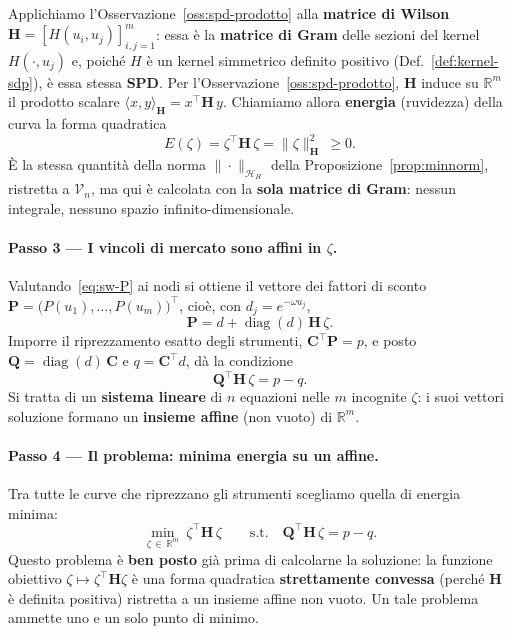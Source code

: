 \documentclass[11pt,a4paper]{article}
\theoremstyle{plain}
\theoremstyle{definition}
\theoremstyle{remark}
\newcommand{\Qmat}{\mathbf{Q}}
\newcommand{\Hmat}{\mathbf{H}}
\newcommand{\transp}{^{\!\top}}
\begin{document}
Applichiamo l'Osservazione~\ref{oss:spd-prodotto} alla \textbf{matrice di Wilson}
$\Hmat = [H(u_i,u_j)]_{i,j=1}^{m}$: essa \`e la \textbf{matrice di Gram} delle sezioni del
kernel $H(\cdot,u_j)$ e, poich\'e $H$ \`e un kernel simmetrico definito positivo
(Def.~\ref{def:kernel-sdp}), \`e essa stessa \textbf{SPD}. Per
l'Osservazione~\ref{oss:spd-prodotto}, $\Hmat$ induce su $\mathbb{R}^m$ il prodotto scalare
$\langle x,y\rangle_{\Hmat} = x\transp\Hmat\,y$. Chiamiamo allora \textbf{energia}
(ruvidezza) della curva la forma quadratica
\[
  E(\zeta) = \zeta\transp \Hmat\, \zeta = \|\zeta\|_{\Hmat}^2 \ \ge 0 .
\]
\`E la stessa quantit\`a della norma $\|\cdot\|_{\mathcal{H}_H}$ della
Proposizione~\ref{prop:minnorm}, ristretta a $\mathcal{V}_n$, ma qui \`e calcolata con la
\textbf{sola matrice di Gram}: nessun integrale, nessuno spazio infinito-dimensionale.

\paragraph{Passo 3 --- I vincoli di mercato sono affini in $\zeta$.}
Valutando~\eqref{eq:sw-P} ai nodi si ottiene il vettore dei fattori di sconto
$\mathbf{P} = \bigl(P(u_1),\dots,P(u_m)\bigr)\transp$, cio\`e, con $d_j = e^{-\omega u_j}$,
\[
  \mathbf{P} = d + \operatorname{diag}(d)\,\Hmat\,\zeta .
\]
Imporre il riprezzamento esatto degli strumenti, $\mathbf{C}\transp \mathbf{P} = p$, e posto
$\Qmat = \operatorname{diag}(d)\,\mathbf{C}$ e $q = \mathbf{C}\transp d$, d\`a la condizione
\[
  \Qmat\transp \Hmat\, \zeta = p - q .
\]
Si tratta di un \textbf{sistema lineare} di $n$ equazioni nelle $m$ incognite $\zeta$:
i suoi vettori soluzione formano un \textbf{insieme affine} (non vuoto) di $\mathbb{R}^m$.

\paragraph{Passo 4 --- Il problema: minima energia su un affine.}
Tra tutte le curve che riprezzano gli strumenti scegliamo quella di energia minima:
\begin{equation}
  \min_{\zeta\,\in\,\mathbb{R}^m} \ \zeta\transp \Hmat\, \zeta
  \qquad \text{s.t.}\quad
  \Qmat\transp \Hmat\, \zeta = p - q .
  \label{eq:minenergia}
\end{equation}
Questo problema \`e \textbf{ben posto} gi\`a prima di calcolarne la soluzione: la funzione
obiettivo $\zeta\mapsto\zeta\transp\Hmat\zeta$ \`e una forma quadratica
\textbf{strettamente convessa} (perch\'e $\Hmat$ \`e definita positiva) ristretta a un
insieme affine non vuoto. Un tale problema ammette uno e un solo punto di minimo.
\end{document}
